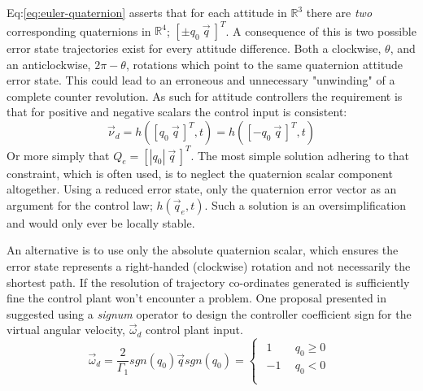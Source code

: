 Eq:\ref{eq:euler-quaternion} asserts that for each attitude in $\mathbb{R}^3$ there are \emph{two} corresponding quaternions in $\mathbb{R}^4$; $[\pm q_0~\vec{q}~]^T$. A consequence of this is two possible error state trajectories exist for every attitude difference. Both a clockwise, $\theta$, and an anticlockwise, $2\pi-\theta$, rotations which point to the same quaternion attitude error state. This could lead to an erroneous and unnecessary "unwinding" of a complete counter revolution. As such for attitude controllers the requirement is that for positive and negative scalars the control input is consistent:
\begin{equation}
\vec{\nu}_d=h([q_0~\vec{q}\hspace{2pt}]^T,t)=h([-q_0~\vec{q}\hspace{2pt}]^T,t)
\end{equation}
Or more simply that $Q_e=[|q_0|~\vec{q}\hspace{2pt}]^T$. The most simple solution adhering to that constraint, which is often used, is to neglect the quaternion scalar component altogether. Using a reduced error state, only the quaternion error vector as an argument for the control law; $h(\vec{q}_e,t)$. Such a solution is an oversimplification and would only ever be locally stable. 
\par
An alternative is to use only the absolute quaternion scalar, which ensures the error state represents a right-handed (clockwise) rotation and not necessarily the shortest path. If the resolution of trajectory co-ordinates generated is sufficiently fine the control plant won't encounter a problem. One proposal presented in \cite{nonlinearquadcopter} suggested using a \emph{signum} operator to design the controller coefficient sign for the virtual angular velocity, $\vec{\omega}_d$ control plant input. 
\begin{subequations}\label{eq:signum-unwinding}
\begin{equation}
\vec{\omega}_d=\frac{2}{\Gamma_1}sgn(q_0)\vec{q}
\end{equation}
\begin{equation}
sgn(q_0)=
\begin{cases}\begin{array}{ll}
1 & ~~q_0\geq 0\\
-1 & ~~q_0< 0\\
\end{array}
\end{cases}
\end{equation}
\end{subequations}
